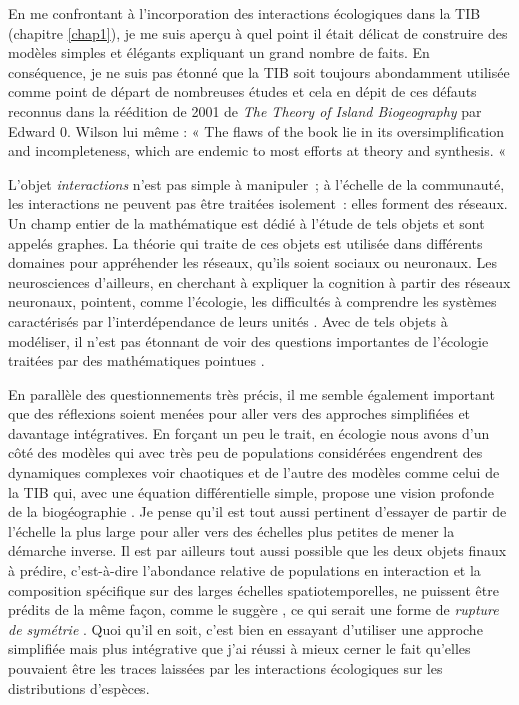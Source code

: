 En me confrontant à l'incorporation des interactions écologiques dans la
TIB (chapitre \ref{chap1}), je me suis aperçu à quel point il était
délicat de construire des modèles simples et élégants expliquant un
grand nombre de faits. En conséquence, je ne suis pas étonné que la TIB
soit toujours abondamment utilisée comme point de départ de nombreuses
études \citep{Warren2015} et cela en dépit de ces défauts reconnus dans
la réédition de 2001 de \emph{The Theory of Island Biogeography} par
Edward 0. Wilson lui même : « The flaws of the book lie in its
oversimplification and incompleteness, which are endemic to most efforts
at theory and synthesis. «

L'objet \emph{interactions} n'est pas simple à manipuler~; à l'échelle
de la communauté, les interactions ne peuvent pas être traitées
isolement~: elles forment des réseaux. Un champ entier de la
mathématique est dédié à l'étude de tels objets et sont appelés graphes.
La théorie qui traite de ces objets est utilisée dans différents
domaines pour appréhender les réseaux, qu'ils soient sociaux ou
neuronaux. Les neurosciences d'ailleurs, en cherchant à expliquer la
cognition à partir des réseaux neuronaux, pointent, comme l'écologie,
les difficultés à comprendre les systèmes caractérisés par
l'interdépendance de leurs unités \citep{Park2013}. Avec de tels objets
à modéliser, il n'est pas étonnant de voir des questions importantes de
l'écologie traitées par des mathématiques pointues
\citep{Allesina2012a, Rohr2014}.

En parallèle des questionnements très précis, il me semble également
important que des réflexions soient menées pour aller vers des approches
simplifiées et davantage intégratives. En forçant un peu le trait, en
écologie nous avons d'un côté des modèles qui avec très peu de
populations considérées engendrent des dynamiques complexes voir
chaotiques \citep[dont l'existence est validée
expérimentalement][]{Costantino1997b, Fussmann2000} et de l'autre des
modèles comme celui de la TIB qui, avec une équation différentielle
simple, propose une vision profonde de la biogéographie
\citep{MacArthur1967}. Je pense qu'il est tout aussi pertinent d'essayer
de partir de l'échelle la plus large pour aller vers des échelles plus
petites de mener la démarche inverse. Il est par ailleurs tout aussi
possible que les deux objets finaux à prédire, c'est-à-dire l'abondance
relative de populations en interaction et la composition spécifique sur
des larges échelles spatiotemporelles, ne puissent être prédits de la
même façon, comme le suggère \citet{Lawton1999}, ce qui serait une forme
de \emph{rupture de symétrie} \citep[au sens de][]{Anderson1972}. Quoi
qu'il en soit, c'est bien en essayant d'utiliser une approche simplifiée
mais plus intégrative que j'ai réussi à mieux cerner le fait qu'elles
pouvaient être les traces laissées par les interactions écologiques sur
les distributions d'espèces.

